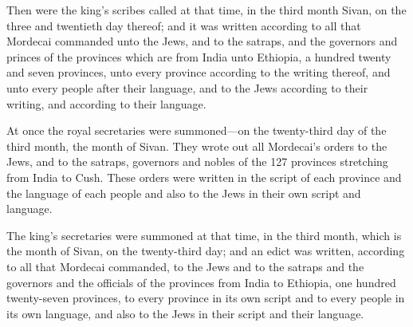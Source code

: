 			\begin{versebox}
					\item[BHS] 
					\item[LXX] 
					\item[ASV] Then were the king's scribes called at that time, in the third month Sivan, on the three and twentieth day thereof; and it was written according to all that Mordecai commanded unto the Jews, and to the satraps, and the governors and princes of the provinces which are from India unto Ethiopia, a hundred twenty and seven provinces, unto every province according to the writing thereof, and unto every people after their language, and to the Jews according to their writing, and according to their language.
					\item[NIV] At once the royal secretaries were summoned—on the twenty-third day of the third month, the month of Sivan. They wrote out all Mordecai’s orders to the Jews, and to the satraps, governors and nobles of the 127 provinces stretching from India to Cush. These orders were written in the script of each province and the language of each people and also to the Jews in their own script and language.
					\item[NRSV] The king’s secretaries were summoned at that time, in the third month, which is the month of Sivan, on the twenty-third day; and an edict was written, according to all that Mordecai commanded, to the Jews and to the satraps and the governors and the officials of the provinces from India to Ethiopia, one hundred twenty-seven provinces, to every province in its own script and to every people in its own language, and also to the Jews in their script and their language.
			\end{versebox}

